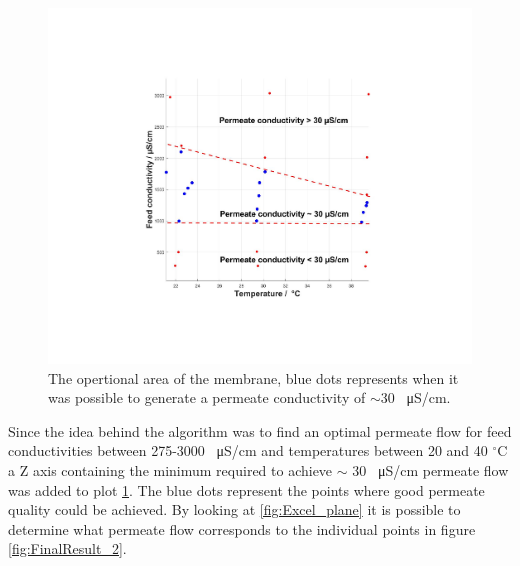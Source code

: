 \begin{figure}[H]
    \centering
    \includegraphics[width=1.1\textwidth]{FinalResult_1}
    \caption{The opertional area of the membrane, blue dots represents when it was possible to generate a permeate conductivity of $\sim$30 \SI{}{\micro\siemens}/cm.}
    \label{fig:FinalResult_1}
\end{figure}

\newpage

Since the idea behind the algorithm was to find an optimal permeate flow for feed conductivities between 275-3000 \SI{}{\micro\siemens}/cm and temperatures between 20 and 40  $^{\circ}$C a Z axis containing the minimum required to achieve $\sim$ 30 \SI{}{\micro\siemens}/cm permeate flow was added to plot \ref{fig:FinalResult_1}. The blue dots represent the points where good permeate quality could be achieved. By looking at  \ref{fig:Excel_plane} it is possible to determine what permeate flow corresponds to the individual points in figure \ref{fig:FinalResult_2}.

